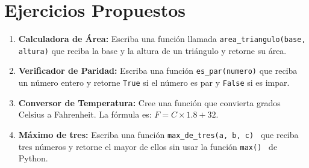 \documentclass[12pt]{article}
\begin{document}
\section{Ejercicios Propuestos}

\begin{enumerate}
    \item \textbf{Calculadora de Área:} Escriba una función llamada \texttt{area\_triangulo(base, altura)} que reciba la base y la altura de un triángulo y retorne su área.
    
    \item \textbf{Verificador de Paridad:} Escriba una función \texttt{es\_par(numero)} que reciba un número entero y retorne \texttt{True} si el número es par y \texttt{False} si es impar.
    
    \item \textbf{Conversor de Temperatura:} Cree una función que convierta grados Celsius a Fahrenheit. La fórmula es: $F = C \times 1.8 + 32$.
    
    \item \textbf{Máximo de tres:} Escriba una función \texttt{max\_de\_tres(a, b, c) } que reciba tres números y retorne el mayor de ellos sin usar la función \texttt{max() } de Python.
\end{enumerate}
\end{document}
